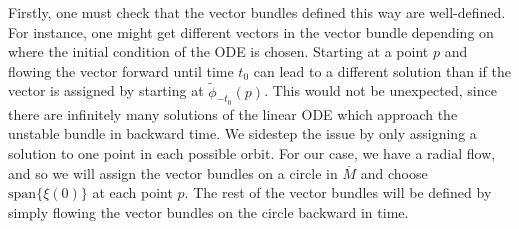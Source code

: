 Firstly, one must check that the vector bundles defined this way are well-defined. For instance, one might get different vectors in the vector bundle depending on where the initial condition of the ODE is chosen. Starting at a point \(p\) and flowing the vector forward until time \(t_0\) can lead to a different solution than if the vector is assigned by starting at \(\tilde\phi_{-t_0}(p)\). This would not be unexpected, since there are infinitely many solutions of the linear ODE which approach the unstable bundle in backward time. We sidestep the issue by only assigning a solution to one point in each possible orbit. For our case, we have a radial flow, and so we will assign the vector bundles on a circle in \(\overline M\) and choose \(\mathrm{span}\{\xi(0)\}\) at each point \(p\). The rest of the vector bundles will be defined by simply flowing the vector bundles on the circle backward in time. 

